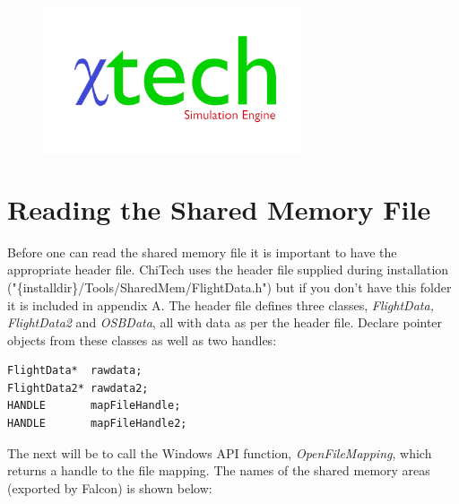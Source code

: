 \documentclass[11pt,letterpaper,titlepage]{article}
\begin{document}
\begin{titlepage}
\begin{center}
\begin{minipage}[c]{0.45\textwidth}
			\begin{figure}[H]
			
				\includegraphics[width=3in]{Logo.png}
			\end{figure}
		\end{minipage}
	\end{center}
	\vspace{2cm}
\end{titlepage}


\pagestyle{fancy}
\cfoot{}
\lfoot{\truncate{14cm}{\NSCDOCTITLE}}
\rhead{}
\chead{\currentname}
\lhead{}
\renewcommand{\footrulewidth}{0.4pt}
\tableofcontents
{}

\listoffigures
\listoftables
{}


\newpage
{}
\section{Reading the Shared Memory File}
Before one can read the shared memory file it is important to have the appropriate header file. ChiTech uses the header file supplied during installation ("\{installdir\}/Tools/SharedMem/FlightData.h") but if you don't have this folder it is included in appendix A.
\newline
\newline
The header file defines three classes, \textit{FlightData, FlightData2} and \textit{OSBData}, all with data as per the header file. Declare pointer objects from these classes as well as two handles:

\begin{lstlisting}
FlightData*  rawdata;
FlightData2* rawdata2;
HANDLE       mapFileHandle;
HANDLE       mapFileHandle2;
\end{lstlisting}

\noindent The next will be to call the Windows API function, \textit{OpenFileMapping}, which returns a handle to the file mapping. The names of the shared memory areas (exported by Falcon) is shown below:
\end{document}
